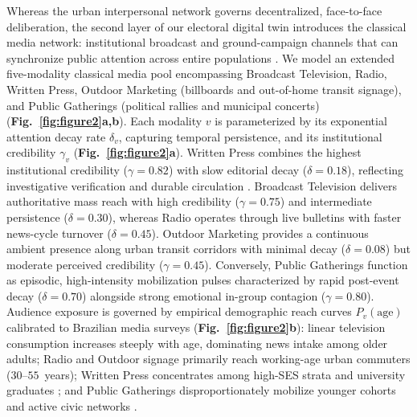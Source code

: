 \documentclass{article}
\begin{document}
Whereas the urban interpersonal network governs decentralized, face-to-face deliberation, the second layer of our electoral digital twin introduces the classical media network: institutional broadcast and ground-campaign channels that can synchronize public attention across entire populations \citep{mccombs1972agenda}. We model an extended five-modality classical media pool encompassing Broadcast Television, Radio, Written Press, Outdoor Marketing (billboards and out-of-home transit signage), and Public Gatherings (political rallies and municipal concerts) (\textbf{Fig.~\ref{fig:figure2}a,b}). Each modality $v$ is parameterized by its exponential attention decay rate $\delta_v$, capturing temporal persistence, and its institutional credibility $\gamma_v$ (\textbf{Fig.~\ref{fig:figure2}a}). Written Press combines the highest institutional credibility ($\gamma = 0.82$) with slow editorial decay ($\delta = 0.18$), reflecting investigative verification and durable circulation \citep{reuters2023digital}. Broadcast Television delivers authoritative mass reach with high credibility ($\gamma = 0.75$) and intermediate persistence ($\delta = 0.30$), whereas Radio operates through live bulletins with faster news-cycle turnover ($\delta = 0.45$). Outdoor Marketing provides a continuous ambient presence along urban transit corridors with minimal decay ($\delta = 0.08$) but moderate perceived credibility ($\gamma = 0.45$). Conversely, Public Gatherings function as episodic, high-intensity mobilization pulses characterized by rapid post-event decay ($\delta = 0.70$) alongside strong emotional in-group contagion ($\gamma = 0.80$). Audience exposure is governed by empirical demographic reach curves $P_v(\mathrm{age})$ calibrated to Brazilian media surveys \citep{kantar2023inside, ibge2022censo} (\textbf{Fig.~\ref{fig:figure2}b}): linear television consumption increases steeply with age, dominating news intake among older adults; Radio and Outdoor signage primarily reach working-age urban commuters ($30$--$55$~years); Written Press concentrates among high-SES strata and university graduates \citep{reuters2023digital}; and Public Gatherings disproportionately mobilize younger cohorts and active civic networks \citep{mcpherson2001birds}.
\end{document}
